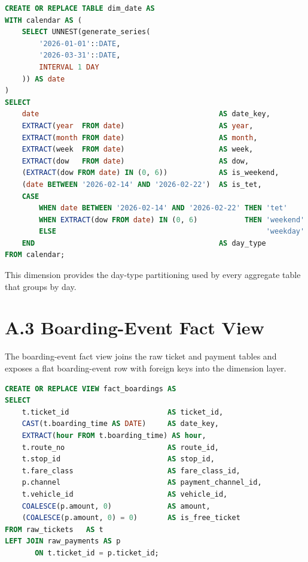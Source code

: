 \begin{lstlisting}[language=SQL, basicstyle=\scriptsize\ttfamily, caption={Calendar dimension table.}]
CREATE OR REPLACE TABLE dim_date AS
WITH calendar AS (
    SELECT UNNEST(generate_series(
        '2026-01-01'::DATE,
        '2026-03-31'::DATE,
        INTERVAL 1 DAY
    )) AS date
)
SELECT
    date                                          AS date_key,
    EXTRACT(year  FROM date)                      AS year,
    EXTRACT(month FROM date)                      AS month,
    EXTRACT(week  FROM date)                      AS week,
    EXTRACT(dow   FROM date)                      AS dow,
    (EXTRACT(dow FROM date) IN (0, 6))            AS is_weekend,
    (date BETWEEN '2026-02-14' AND '2026-02-22')  AS is_tet,
    CASE
        WHEN date BETWEEN '2026-02-14' AND '2026-02-22' THEN 'tet'
        WHEN EXTRACT(dow FROM date) IN (0, 6)           THEN 'weekend'
        ELSE                                                 'weekday'
    END                                           AS day_type
FROM calendar;
\end{lstlisting}

\noindent This dimension provides the day-type partitioning used by every aggregate table that groups by day.

\section*{A.3 Boarding-Event Fact View}

The boarding-event fact view joins the raw ticket and payment tables and exposes a flat boarding-event row with foreign keys into the dimension layer.

\begin{lstlisting}[language=SQL, basicstyle=\scriptsize\ttfamily, caption={Boarding-event fact view.}]
CREATE OR REPLACE VIEW fact_boardings AS
SELECT
    t.ticket_id                       AS ticket_id,
    CAST(t.boarding_time AS DATE)     AS date_key,
    EXTRACT(hour FROM t.boarding_time) AS hour,
    t.route_no                        AS route_id,
    t.stop_id                         AS stop_id,
    t.fare_class                      AS fare_class_id,
    p.channel                         AS payment_channel_id,
    t.vehicle_id                      AS vehicle_id,
    COALESCE(p.amount, 0)             AS amount,
    (COALESCE(p.amount, 0) = 0)       AS is_free_ticket
FROM raw_tickets   AS t
LEFT JOIN raw_payments AS p
       ON t.ticket_id = p.ticket_id;
\end{lstlisting}

